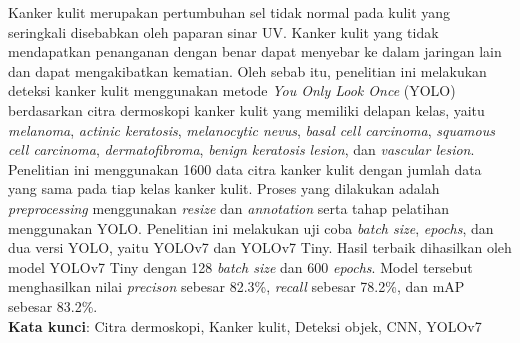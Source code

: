 \documentclass[]{mathuinsa}
\begin{document}
    \newpage{}
    \begin{onehalfspacing}\listoftables\end{onehalfspacing}


    \newpage{}
    \begin{onehalfspacing}\listoffigures\end{onehalfspacing}


    \begin{abstractind}
        Kanker kulit merupakan pertumbuhan sel tidak normal pada kulit yang seringkali disebabkan oleh paparan sinar UV. Kanker kulit yang tidak mendapatkan penanganan dengan benar dapat menyebar ke dalam jaringan lain dan dapat mengakibatkan kematian. Oleh sebab itu, penelitian ini melakukan deteksi kanker kulit menggunakan metode \textit{You Only Look Once} (YOLO) berdasarkan citra dermoskopi kanker kulit yang memiliki delapan kelas, yaitu \textit{melanoma}, \textit{actinic keratosis}, \textit{melanocytic nevus}, \textit{basal cell carcinoma}, \textit{squamous cell carcinoma}, \textit{dermatofibroma}, \textit{benign keratosis lesion}, dan \textit{vascular lesion}. Penelitian ini menggunakan 1600 data citra kanker kulit dengan jumlah data yang sama pada tiap kelas kanker kulit. Proses yang dilakukan adalah \textit{preprocessing} menggunakan \textit{resize} dan \textit{annotation} serta tahap pelatihan menggunakan YOLO. Penelitian ini melakukan uji coba \textit{batch size}, \textit{epochs}, dan dua versi YOLO, yaitu YOLOv7 dan YOLOv7 Tiny. Hasil terbaik dihasilkan oleh model YOLOv7 Tiny dengan 128 \textit{batch size} dan 600 \textit{epochs}. Model tersebut menghasilkan nilai \textit{precison} sebesar 82.3\%, \textit{recall} sebesar 78.2\%, dan mAP sebesar 83.2\%.\\
        \noindent
        \textbf{Kata kunci}: Citra dermoskopi, Kanker kulit, Deteksi objek, CNN, YOLOv7
    \end{abstractind}
    
\end{document}
